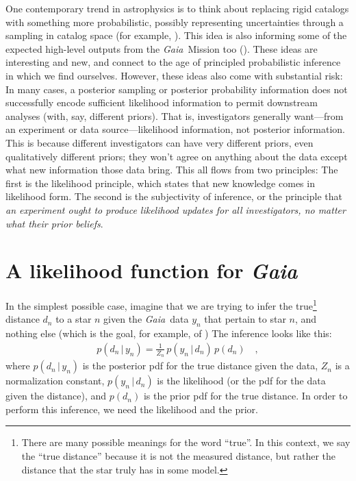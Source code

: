 \documentclass[12pt, modern]{aastex62h}
\newcommand{\Gaia}{\textsl{Gaia}}
\newcommand{\given}{\,|\,}
\begin{document}
One contemporary trend in astrophysics is to think about replacing rigid
catalogs with something more probabilistic, possibly representing uncertainties
through a sampling in catalog space (for example, \citealt{brewer, portillo}).
This idea is also informing some of the expected high-level outputs from
the \Gaia\ Mission too (\citealt{apsis}).
These ideas are interesting and new, and connect to the age of principled
probabilistic inference in which we find ourselves.
However, these ideas also come with substantial risk:
In many cases, a posterior sampling or posterior probability information
does not successfully encode sufficient likelihood information to permit
downstream analyses (with, say, different priors).
That is, investigators generally want---from an experiment or data source---likelihood
information, not posterior information.
This is because different investigators can have very different priors,
even qualitatively different priors; they won't agree on anything about the
data except what new information those data bring.
This all flows from two principles: The first is the likelihood principle,
which states that new knowledge comes in likelihood form.
The second is the subjectivity of inference, or the principle that
\emph{an experiment ought to produce likelihood updates for all investigators,
no matter what their prior beliefs}.

\section{A likelihood function for \textsl{Gaia}}
In the simplest possible case, imagine that we are trying to infer
the true\footnote{There are many possible meanings for the word ``true''.
  In this context, we say the ``true distance'' because it is not the measured
  distance, but rather the distance that the star truly has in some model.}
distance $d_n$ to a star $n$ given the \Gaia\ data $y_n$ that
pertain to star $n$, and nothing else
(which is the goal, for example, of \citealt{tri2})
The inference looks like this:
\begin{eqnarray}
p(d_n\given y_n) = \frac{1}{Z_n}\,p(y_n\given d_n)\,p(d_n)
\label{eq:inference}
\quad ,
\end{eqnarray}
where
$p(d_n\given y_n)$ is the posterior pdf for the true distance given the data,
$Z_n$ is a normalization constant,
$p(y_n\given d_n)$ is the likelihood (or the pdf for the data given the distance),
and $p(d_n)$ is the prior pdf for the true distance.
In order to perform this inference, we need the likelihood and the prior.
\end{document}
